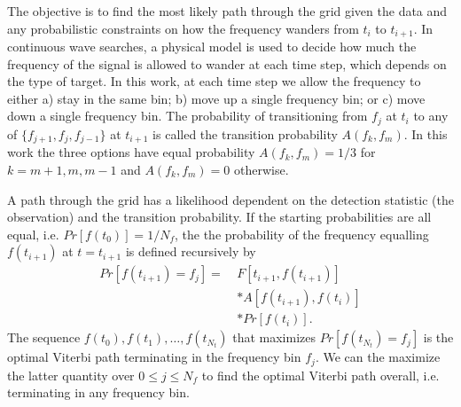 \documentclass[paper-main.tex]{subfiles}
\begin{document}
The objective is to find the most likely path through the grid given the data and any probabilistic constraints on how the frequency wanders from $t_i$ to $t_{i+1}$. 
In continuous wave searches, a physical model is used to decide how much the frequency of the signal is allowed to wander at each time step, which depends on the type of target. 
In this work, at each time step we allow the frequency to either a) stay in the same bin; b) move up a single frequency bin; or c) move down a single frequency bin. 
The probability of transitioning from $f_j$ at $t_i$ to any of $\{f_{j+1},f_j,f_{j-1}\}$ at $t_{i+1}$ is called the transition probability $A(f_k,f_m)$. 
In this work the three options have equal probability $A(f_k,f_m)=1/3$ for $k=m+1,m,m-1$ and $A(f_k,f_m)=0$ otherwise.


A path through the grid has a likelihood dependent on the detection statistic (the observation) and the transition probability.
If the starting probabilities are all equal, i.e. $Pr[f(t_0)] = 1/N_f$, the the probability of the frequency equalling $f(t_{i+1})$ at $t = t_{i+1}$ is defined recursively by
\begin{eqnarray}
Pr[f(t_{i+1})=f_j] =~& F[t_{i+1},f(t_{i+1})] \nonumber \\
                     &*A[f(t_{i+1}),f(t_i)]  \nonumber \\
                     & *Pr[f(t_i)].
\label{eqn:recursiveViterbi}
\end{eqnarray}
The sequence $f(t_0),f(t_1),\dots,f(t_{N_t})$ that maximizes $Pr[f(t_{N_t}) = f_j]$ is the optimal Viterbi path terminating in the frequency bin $f_j$. 
We can the maximize the latter quantity over $0 \leq j \leq N_f$ to find the optimal Viterbi path overall, i.e. terminating in any frequency bin. 
\end{document}
